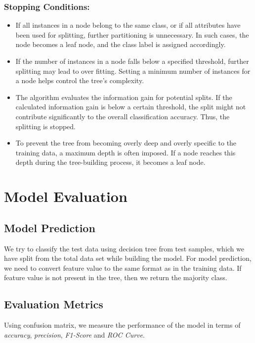 \documentclass{article}
\begin{document}
\subsubsection{Stopping Conditions:}
\begin{itemize}
    \item If all instances in a node belong to the same class, or if all attributes have been used for splitting, further partitioning is unnecessary. In such cases, the node becomes a leaf node, and the class label is assigned accordingly.
    \item If the number of instances in a node falls below a specified threshold, further splitting may lead to over fitting. Setting a minimum number of instances for a node helps control the tree's complexity.
    \item The algorithm evaluates the information gain for potential splits. If the calculated information gain is below a certain threshold, the split might not contribute significantly to the overall classification accuracy. Thus, the splitting is stopped.
    \item To prevent the tree from becoming overly deep and overly specific to the training data, a maximum depth is often imposed. If a node reaches this depth during the tree-building process, it becomes a leaf node.
\end{itemize}

\section{Model Evaluation}\label{sec:eval}

\subsection{Model Prediction}
We try to classify the test data using decision tree from test samples, which we have split from the total data set while building the model. For model prediction, we need to convert feature value to the same format as in the training data. If feature value is not present in the tree, then we return the majority class.

\subsection{Evaluation Metrics}
Using confusion matrix, we measure the performance of the model in terms of \textit{accuracy}, \textit{precision}, \textit{F1-Score} and \textit{ROC Curve}.
\end{document}
